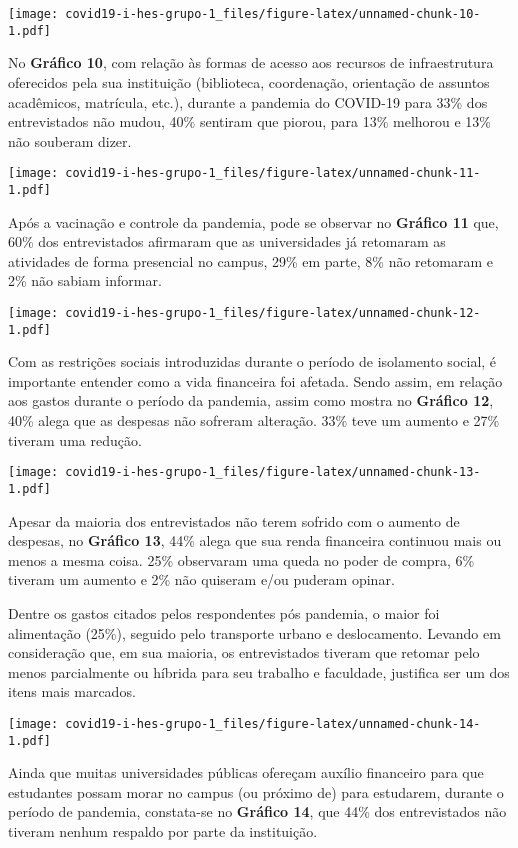 \documentclass[
]{article}
\begin{document}
\texttt{[image: covid19-i-hes-grupo-1\_files/figure-latex/unnamed-chunk-10-1.pdf]}

No \textbf{Gráfico 10}, com relação às formas de acesso aos recursos de
infraestrutura oferecidos pela sua instituição (biblioteca, coordenação,
orientação de assuntos acadêmicos, matrícula, etc.), durante a pandemia
do COVID-19 para 33\% dos entrevistados não mudou, 40\% sentiram que
piorou, para 13\% melhorou e 13\% não souberam dizer.

\texttt{[image: covid19-i-hes-grupo-1\_files/figure-latex/unnamed-chunk-11-1.pdf]}

Após a vacinação e controle da pandemia, pode se observar no
\textbf{Gráfico 11} que, 60\% dos entrevistados afirmaram que as
universidades já retomaram as atividades de forma presencial no campus,
29\% em parte, 8\% não retomaram e 2\% não sabiam informar.

\texttt{[image: covid19-i-hes-grupo-1\_files/figure-latex/unnamed-chunk-12-1.pdf]}

Com as restrições sociais introduzidas durante o período de isolamento
social, é importante entender como a vida financeira foi afetada. Sendo
assim, em relação aos gastos durante o período da pandemia, assim como
mostra no \textbf{Gráfico 12}, 40\% alega que as despesas não sofreram
alteração. 33\% teve um aumento e 27\% tiveram uma redução.

\texttt{[image: covid19-i-hes-grupo-1\_files/figure-latex/unnamed-chunk-13-1.pdf]}

Apesar da maioria dos entrevistados não terem sofrido com o aumento de
despesas, no \textbf{Gráfico 13}, 44\% alega que sua renda financeira
continuou mais ou menos a mesma coisa. 25\% observaram uma queda no
poder de compra, 6\% tiveram um aumento e 2\% não quiseram e/ou puderam
opinar.

Dentre os gastos citados pelos respondentes pós pandemia, o maior foi
alimentação (25\%), seguido pelo transporte urbano e deslocamento.
Levando em consideração que, em sua maioria, os entrevistados tiveram
que retomar pelo menos parcialmente ou híbrida para seu trabalho e
faculdade, justifica ser um dos itens mais marcados.

\texttt{[image: covid19-i-hes-grupo-1\_files/figure-latex/unnamed-chunk-14-1.pdf]}

Ainda que muitas universidades públicas ofereçam auxílio financeiro para
que estudantes possam morar no campus (ou próximo de) para estudarem,
durante o período de pandemia, constata-se no \textbf{Gráfico 14}, que
44\% dos entrevistados não tiveram nenhum respaldo por parte da
instituição.
\end{document}
